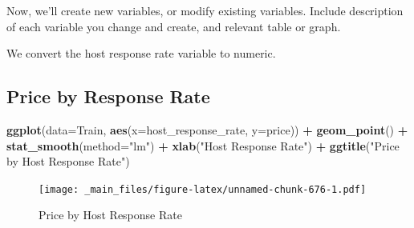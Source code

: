 \documentclass[]{book}
\newenvironment{Shaded}{\begin{snugshade}}{\end{snugshade}}
\newcommand{\KeywordTok}[1]{\textcolor[rgb]{0.13,0.29,0.53}{\textbf{#1}}}
\newcommand{\DataTypeTok}[1]{\textcolor[rgb]{0.13,0.29,0.53}{#1}}
\newcommand{\StringTok}[1]{\textcolor[rgb]{0.31,0.60,0.02}{#1}}
\newcommand{\OperatorTok}[1]{\textcolor[rgb]{0.81,0.36,0.00}{\textbf{#1}}}
\newcommand{\NormalTok}[1]{#1}
\begin{document}
Now, we'll create new variables, or modify existing variables. Include
description of each variable you change and create, and relevant table
or graph.

We convert the host response rate variable to numeric.

\begin{Shaded}
\end{Shaded}

\subsection{Price by Response Rate}\label{price-by-response-rate}

\begin{Shaded}
\begin{Highlighting}[]
\KeywordTok{ggplot}\NormalTok{(}\DataTypeTok{data=}\NormalTok{Train, }\KeywordTok{aes}\NormalTok{(}\DataTypeTok{x=}\NormalTok{host_response_rate, }\DataTypeTok{y=}\NormalTok{price)) }\OperatorTok{+}\StringTok{ }\KeywordTok{geom_point}\NormalTok{() }\OperatorTok{+}\StringTok{ }
\StringTok{  }\KeywordTok{stat_smooth}\NormalTok{(}\DataTypeTok{method=}\StringTok{"lm"}\NormalTok{) }\OperatorTok{+}\StringTok{ }\KeywordTok{xlab}\NormalTok{(}\StringTok{"Host Response Rate"}\NormalTok{) }\OperatorTok{+}\StringTok{ }\KeywordTok{ggtitle}\NormalTok{(}\StringTok{"Price by Host Response Rate"}\NormalTok{)}
\end{Highlighting}
\end{Shaded}

\begin{figure}
\centering
\texttt{[image: \_main\_files/figure-latex/unnamed-chunk-676-1.pdf]}
\caption{\label{fig:unnamed-chunk-676}Price by Host Response Rate}
\end{figure}
\end{document}
